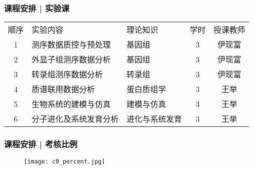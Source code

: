 \begin{frame}
  \frametitle{课程安排 | 实验课}
  \begin{table}
    \centering
    \begin{tabular}{cllcc}
      \hline
      \rowcolor{blue!50}顺序 & 实验内容 & 理论知识 & 学时 & 授课教师\\
      1 & 测序数据质控与预处理 & 基因组 & 3 & 伊现富\\
      2 & 外显子组测序数据分析 & 基因组 & 3 & 伊现富\\
      3 & 转录组测序数据分析 & 转录组 & 3 & 伊现富\\
      4 & 质谱联用数据分析& 蛋白质组学 & 3 & 王举\\
      5 & 生物系统的建模与仿真& 建模与仿真 & 3 & 王举\\
      6 & 分子进化及系统发育分析& 进化与系统发育 & 3 & 王举\\
      \hline
    \end{tabular}
  \end{table}
\end{frame}

\begin{frame}
  \frametitle{课程安排 | 考核比例}
  \begin{figure}
    \centering
    \texttt{[image: c0\_percent.jpg]}
  \end{figure}
\end{frame}


